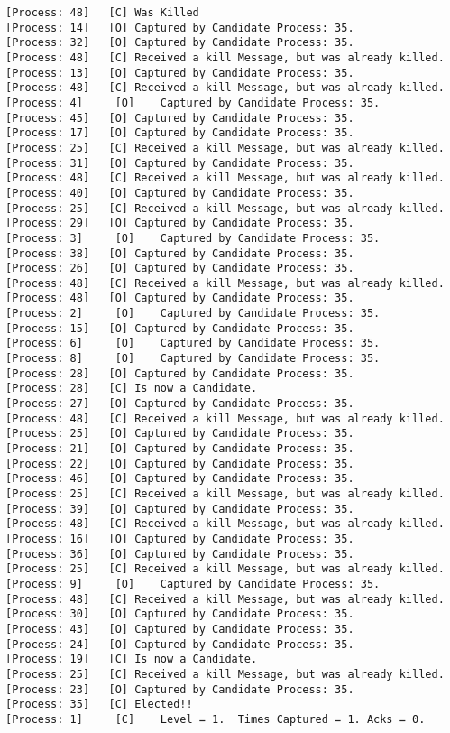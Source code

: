 \begin{Verbatim}[commandchars=\\\{\},codes={\catcode`$=3\catcode`_=8},frame=single,label=Test 6 output]
[Process: 48]	[C]	Was Killed
[Process: 14]	[O]	Captured by Candidate Process: 35.
[Process: 32]	[O]	Captured by Candidate Process: 35.
[Process: 48]	[C]	Received a kill Message, but was already killed.
[Process: 13]	[O]	Captured by Candidate Process: 35.
[Process: 48]	[C]	Received a kill Message, but was already killed.
[Process: 4]	 [O]	Captured by Candidate Process: 35.
[Process: 45]	[O]	Captured by Candidate Process: 35.
[Process: 17]	[O]	Captured by Candidate Process: 35.
[Process: 25]	[C]	Received a kill Message, but was already killed.
[Process: 31]	[O]	Captured by Candidate Process: 35.
[Process: 48]	[C]	Received a kill Message, but was already killed.
[Process: 40]	[O]	Captured by Candidate Process: 35.
[Process: 25]	[C]	Received a kill Message, but was already killed.
[Process: 29]	[O]	Captured by Candidate Process: 35.
[Process: 3]	 [O]	Captured by Candidate Process: 35.
[Process: 38]	[O]	Captured by Candidate Process: 35.
[Process: 26]	[O]	Captured by Candidate Process: 35.
[Process: 48]	[C]	Received a kill Message, but was already killed.
[Process: 48]	[O]	Captured by Candidate Process: 35.
[Process: 2]	 [O]	Captured by Candidate Process: 35.
[Process: 15]	[O]	Captured by Candidate Process: 35.
[Process: 6]	 [O]	Captured by Candidate Process: 35.
[Process: 8]	 [O]	Captured by Candidate Process: 35.
[Process: 28]	[O]	Captured by Candidate Process: 35.
[Process: 28]	[C]	Is now a Candidate.
[Process: 27]	[O]	Captured by Candidate Process: 35.
[Process: 48]	[C]	Received a kill Message, but was already killed.
[Process: 25]	[O]	Captured by Candidate Process: 35.
[Process: 21]	[O]	Captured by Candidate Process: 35.
[Process: 22]	[O]	Captured by Candidate Process: 35.
[Process: 46]	[O]	Captured by Candidate Process: 35.
[Process: 25]	[C]	Received a kill Message, but was already killed.
[Process: 39]	[O]	Captured by Candidate Process: 35.
[Process: 48]	[C]	Received a kill Message, but was already killed.
[Process: 16]	[O]	Captured by Candidate Process: 35.
[Process: 36]	[O]	Captured by Candidate Process: 35.
[Process: 25]	[C]	Received a kill Message, but was already killed.
[Process: 9]	 [O]	Captured by Candidate Process: 35.
[Process: 48]	[C]	Received a kill Message, but was already killed.
[Process: 30]	[O]	Captured by Candidate Process: 35.
[Process: 43]	[O]	Captured by Candidate Process: 35.
[Process: 24]	[O]	Captured by Candidate Process: 35.
[Process: 19]	[C]	Is now a Candidate.
[Process: 25]	[C]	Received a kill Message, but was already killed.
[Process: 23]	[O]	Captured by Candidate Process: 35.
[Process: 35]	[C]	Elected!! 
[Process: 1]	 [C]	Level = 1.	Times Captured = 1.	Acks = 0.

\end{Verbatim}
